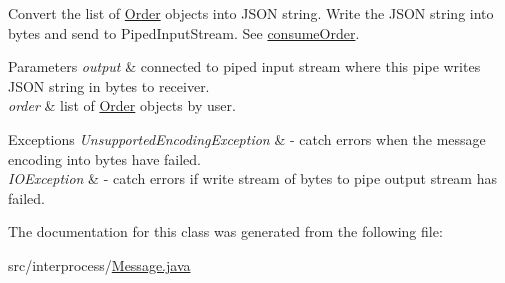 Convert the list of \hyperlink{classinterprocess_1_1_order}{Order} objects into J\+S\+ON string. Write the J\+S\+ON string into bytes and send to Piped\+Input\+Stream. See \hyperlink{classinterprocess_1_1_message_ada4c768cf0688deaede00d43220fd100}{consume\+Order}. 
\begin{DoxyParams}{Parameters}
{\em output} & connected to piped input stream where this pipe writes J\+S\+ON string in bytes to receiver. \\
\hline
{\em order} & list of \hyperlink{classinterprocess_1_1_order}{Order} objects by user. \\
\hline
\end{DoxyParams}

\begin{DoxyExceptions}{Exceptions}
{\em Unsupported\+Encoding\+Exception} & -\/ catch errors when the message encoding into bytes have failed. \\
\hline
{\em I\+O\+Exception} & -\/ catch errors if write stream of bytes to pipe output stream has failed. \\
\hline
\end{DoxyExceptions}


The documentation for this class was generated from the following file\+:\begin{DoxyCompactItemize}
\item 
src/interprocess/\hyperlink{_message_8java}{Message.\+java}\end{DoxyCompactItemize}
